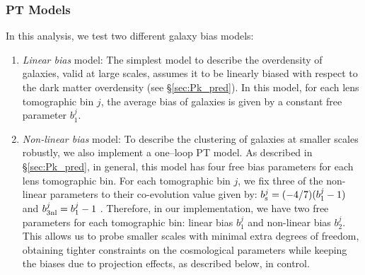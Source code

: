 \documentclass[aps, prd,twocolumn,superscriptaddress,nofootinbib,preprintnumbers]{revtex4-1}
\newcommand{\SP}[1]{{\color{orange}[SP: #1]}}
\newcommand{\jdr}[1]{{\color{blue}[JDR: #1]}}
\newcommand{\gary}[1]{\textcolor{red}{#1}}
\begin{document}
\subsubsection{PT Models}
\label{sec:pt_models}
In this analysis, we test two different galaxy bias models: 
\begin{enumerate}
    \item \textit{Linear bias} model: The simplest model to describe the overdensity of galaxies, valid at large scales, assumes it to be linearly biased with respect to the dark matter overdensity (see \S\ref{sec:Pk_pred}). In this model, for each lens tomographic bin $j$, the average bias of galaxies is given by a constant free parameter $b^j_1$. 
    \item \textit{Non-linear bias} model: 
    To describe the clustering of galaxies at smaller scales robustly, we also implement a one--loop PT model. As described in \S\ref{sec:Pk_pred}, in general, this model has four free bias parameters for each lens tomographic bin. For each tomographic bin $j$, we fix three of the non-linear parameters to their co-evolution value given by: $b^{j}_{\rm s} = (-4/7) (b^j_1 - 1)$ and $b^{j}_{\rm 3nl} = b^j_1 - 1$ \citep{McDonald2009,Saito2014a}. Therefore, in our implementation, we have two free parameters for each tomographic bin: linear bias $b^{j}_1$ and non-linear bias $b^{j}_2$. This allows us to probe smaller scales with minimal extra degrees of freedom, obtaining tighter constraints on the cosmological parameters while keeping the biases due to projection effects, as described below, in control. 
    

\end{enumerate}
\end{document}
